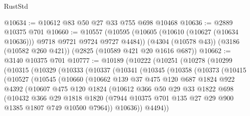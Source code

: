 \begin{lexlean}{RustStd}
\begin{coremodule}
@10634 := @10612 @83 @50 @27 @33 @755 @698 @10468
@10636 := @2889 @10375 @701
@10660 := @10557
    (@10595 (@10605 (@10610 (@10627 (@10634 @10636))) @9718 @9721 @9724 @9727 @4484))
    (@4304 (@10578 @43))
    (@3186 (@10582 @260 @421))
    (@2825 (@10589 @421 @20 @1616 @687))
@10662 := @3140 @10375 @701
@10777 := @10189
    (@10222
      (@10251
        (@10278
          (@10299
            (@10315
              (@10329
                (@10333
                  (@10337
                    (@10341
                      (@10345
                        (@10358
                          (@10373
                            (@10415
                              (@10527
                                (@10545
                                  (@10660
                                    (@10662
                                      @139
                                      @37
                                      @475
                                      @120
                                      @687
                                      @1824
                                      @922
                                      @4392
                                      (@10607
                                        @475
                                        @120
                                        @1824
                                        (@10612
                                          @366
                                          @50
                                          @29
                                          @33
                                          @1822
                                          @698
                                          (@10432
                                            @366
                                            @29
                                            @1818
                                            @1820
                                            (@7944
                                              @10375
                                              @701
                                              @135
                                              @27
                                              @29
                                              @900
                                              @1385
                                              @1807
                                              @749
                                              @10500
                                              @7964))
                                          @10636))
                                      @4494))

\end{coremodule}
\end{lexlean}
